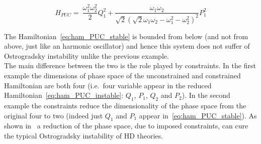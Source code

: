 \begin{equation} \label{eq:ham_PUC_stable}
  H_{PUC} =\ \frac{\omega_1^2\omega_2^2}{2} Q_1^2 +
  \frac{\omega_1\omega_2}{\sqrt{2} {\left(\sqrt{2} \omega_1\omega_2 -
  \omega_1^2 - \omega_2^2 \right)}^2} P_1^2
\end{equation}

The Hamiltonian~\eqref{eq:ham_PUC_stable} is bounded from below (and not from
above, just like an harmonic oscillator) and hence this system does not suffer
of Ostrogradsky instability unlike the previous example. \\

The main difference between the two is the role played by constraints. In the
first example the dimensions of phase space of the unconstrained and constrained
Hamiltonian are both four (i.e.\ four variable appear in the reduced
Hamiltonian~\eqref{eq:ham_PUC_instable}: $Q_1$, $P_1$, $Q_2$ and $P_2$). In the
second example the constraints reduce the dimensionality of the phase space from
the original four to two (indeed just $Q_1$ and $P_1$ appear
in~\eqref{eq:ham_PUC_stable}). As shown in~\cite{Chen13} a reduction of the
phase space, due to imposed constraints, can cure the typical Ostrogradsky
instability of HD theories.
